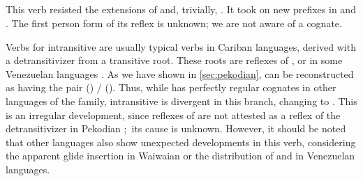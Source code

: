 \subsection{ }
\label{sec:bathe}
This verb resisted the extensions of \PPek {}  and, trivially, \akuriyo {} .
It took on new  prefixes in \PTir {} and \PWai {}.
The first person form of its \carijo reflex  \parencites[72]{koch1908hiana} is unknown; we are not aware of a \yukpa cognate.

Verbs for intransitive  are usually typical  verbs in Cariban languages, derived with a detransitivizer from a transitive root.
These roots are reflexes of , or  in some Venezuelan languages .
As we have shown in \cref{sec:pekodian}, \PPek can be reconstructed as having the pair  () /  ().
Thus, while \PPek {} has perfectly regular cognates in other languages of the family, intransitive  is divergent in this branch, changing  to .
This is an irregular development, since reflexes of  are not attested as a reflex of the detransitivizer in Pekodian \parencite[506]{meira2010origin}; its cause is unknown.
However, it should be noted that other languages also show unexpected developments in this verb, considering the apparent glide insertion in Waiwaian or the distribution of  and  in Venezuelan languages.

%

